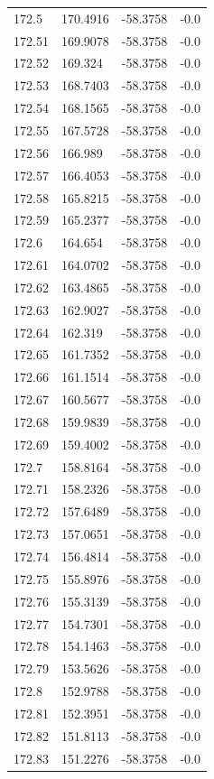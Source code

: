 \begin{table}[H]
\begin{tabular}{llll}
172.5 & 170.4916 & -58.3758 & -0.0 \\
172.51 & 169.9078 & -58.3758 & -0.0 \\
172.52 & 169.324 & -58.3758 & -0.0 \\
172.53 & 168.7403 & -58.3758 & -0.0 \\
172.54 & 168.1565 & -58.3758 & -0.0 \\
172.55 & 167.5728 & -58.3758 & -0.0 \\
172.56 & 166.989 & -58.3758 & -0.0 \\
172.57 & 166.4053 & -58.3758 & -0.0 \\
172.58 & 165.8215 & -58.3758 & -0.0 \\
172.59 & 165.2377 & -58.3758 & -0.0 \\
172.6 & 164.654 & -58.3758 & -0.0 \\
172.61 & 164.0702 & -58.3758 & -0.0 \\
172.62 & 163.4865 & -58.3758 & -0.0 \\
172.63 & 162.9027 & -58.3758 & -0.0 \\
172.64 & 162.319 & -58.3758 & -0.0 \\
172.65 & 161.7352 & -58.3758 & -0.0 \\
172.66 & 161.1514 & -58.3758 & -0.0 \\
172.67 & 160.5677 & -58.3758 & -0.0 \\
172.68 & 159.9839 & -58.3758 & -0.0 \\
172.69 & 159.4002 & -58.3758 & -0.0 \\
172.7 & 158.8164 & -58.3758 & -0.0 \\
172.71 & 158.2326 & -58.3758 & -0.0 \\
172.72 & 157.6489 & -58.3758 & -0.0 \\
172.73 & 157.0651 & -58.3758 & -0.0 \\
172.74 & 156.4814 & -58.3758 & -0.0 \\
172.75 & 155.8976 & -58.3758 & -0.0 \\
172.76 & 155.3139 & -58.3758 & -0.0 \\
172.77 & 154.7301 & -58.3758 & -0.0 \\
172.78 & 154.1463 & -58.3758 & -0.0 \\
172.79 & 153.5626 & -58.3758 & -0.0 \\
172.8 & 152.9788 & -58.3758 & -0.0 \\
172.81 & 152.3951 & -58.3758 & -0.0 \\
172.82 & 151.8113 & -58.3758 & -0.0 \\
172.83 & 151.2276 & -58.3758 & -0.0 \\

\end{tabular}
\end{table}
